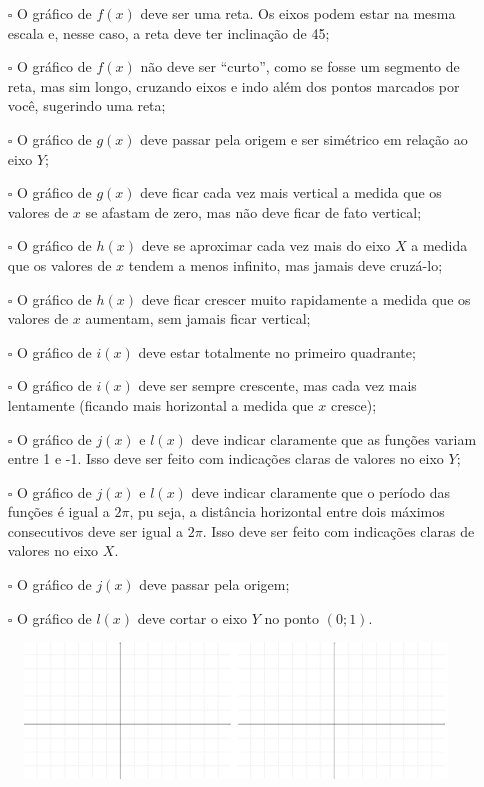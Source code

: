 \documentclass[main.tex]{subfiles}
\begin{document}
\begin{itemize}
 \item[$\square$] O gráfico de $f(x)$ deve ser uma reta. Os eixos podem estar na mesma escala e, nesse caso, a reta deve ter inclinação de 45\degree;
 \item[$\square$] O gráfico de $f(x)$ não deve ser ``curto'', como se fosse um segmento de reta, mas sim longo, cruzando eixos e indo além dos pontos marcados por você, sugerindo uma reta;
 \item[$\square$] O gráfico de $g(x)$ deve passar pela origem e ser simétrico em relação ao eixo $Y$;
 \item[$\square$] O gráfico de $g(x)$ deve ficar cada vez mais vertical a medida que os valores de $x$ se afastam de zero, mas não deve ficar de fato vertical;
 \item[$\square$] O gráfico de $h(x)$ deve se aproximar cada vez mais do eixo $X$ a medida que os valores de $x$ tendem a menos infinito, mas jamais deve cruzá-lo;
 \item[$\square$] O gráfico de $h(x)$ deve ficar crescer muito rapidamente a medida que os valores de $x$ aumentam, sem jamais ficar vertical;
 \item[$\square$] O gráfico de $i(x)$ deve estar totalmente no primeiro quadrante;
 \item[$\square$] O gráfico de $i(x)$ deve ser sempre crescente, mas cada vez mais lentamente (ficando mais horizontal a medida que $x$ cresce);
 \item[$\square$] O gráfico de $j(x)$ e $l(x)$ deve indicar claramente que as funções variam entre 1 e -1. Isso deve ser feito com indicações claras de valores no eixo $Y$;
 \item[$\square$] O gráfico de $j(x)$ e $l(x)$ deve indicar claramente que o período das funções é igual a $2\pi$, pu seja, a distância horizontal entre dois máximos consecutivos deve ser igual a $2\pi$. Isso deve ser feito com indicações claras de valores no eixo $X$.
 \item[$\square$] O gráfico de $j(x)$ deve passar pela origem;
 \item[$\square$] O gráfico de $l(x)$ deve cortar o eixo $Y$ no ponto $(0;1)$.
\end{itemize}

\newpage

\begin{figure}[h]
\centering
\includegraphics[width=\textwidth]{./img/c7q1.png}
\end{figure}
\end{document}
